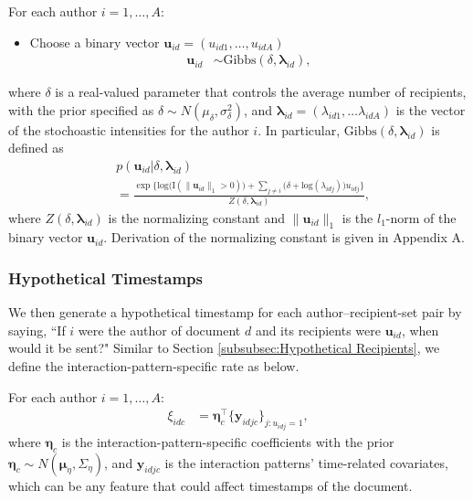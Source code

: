 \documentclass[twoside]{article}
\begin{document}
For each author $i =1,\ldots,A$:
\begin{itemize}
	\item Choose a binary vector $\boldsymbol{u}_{id}= (u_{id1},
	\ldots, u_{idA})$
\begin{align*} \boldsymbol{u}_{id} & \sim
\mbox{Gibbs}(\delta, \boldsymbol{\lambda}_{id}),
\end{align*}
\end{itemize}
	where $\delta$ is a real-valued parameter that controls the average number of recipients, with the prior specified as $\delta \sim N(\mu_\delta,\sigma^2_\delta)$, and $\boldsymbol{\lambda}_{id}=(\lambda_{id1},\ldots\lambda_{idA})$ is the vector of the stochoastic intensities for the author $i$. In particular, $\mbox{Gibbs}(\delta, \boldsymbol{\lambda}_{id})$ is defined as
	\begin{align*}
	&p(\boldsymbol{u}_{id}|\delta, \boldsymbol{\lambda}_{id}) \\&= \frac{\exp\Big\{\mbox{log}\Big(\text{I}( \lVert \boldsymbol{u}_{id}\rVert_1 > 0 )\Big) + \sum_{j \neq i} \Big(\delta+\mbox{log}(\lambda_{idj})\Big)u_{idj}\Big\}}{Z(\delta,\boldsymbol{\lambda}_{id})} ,
	\end{align*}
where $Z(\delta,\boldsymbol{\lambda}_{id})$ is the normalizing constant and $\lVert \boldsymbol{u}_{id}\rVert_1$ is the $l_1$-norm of the binary vector $\boldsymbol{u}_{id}$. Derivation of the normalizing constant is given in Appendix A. 

\subsubsection{Hypothetical Timestamps}\label{subsubsec:Hypothetical Timestamps}
We then generate a hypothetical timestamp for each author--recipient-set pair by saying, ``If $i$ were the author of document $d$ and its recipients were $\boldsymbol{u}_{id}$, when would it be sent?" Similar to Section \ref{subsubsec:Hypothetical Recipients}, we define the interaction-pattern-specific rate as below.

For each author $i =1,\ldots,A$:
\begin{align*}
\xi_{idc}& = \boldsymbol{\eta}_c^\top\{ \boldsymbol{y}_{idjc}\}_{j:u_{idj}= 1},
\end{align*}
where $\boldsymbol{\eta}_c$ is the interaction-pattern-specific coefficients with the prior $\boldsymbol{\eta}_c \sim N(\boldsymbol{\mu}_\eta,\Sigma_\eta)$, and $\boldsymbol{y}_{idjc}$ is the interaction patterns' time-related covariates, which can be any feature that could affect timestamps of the document.
\end{document}
